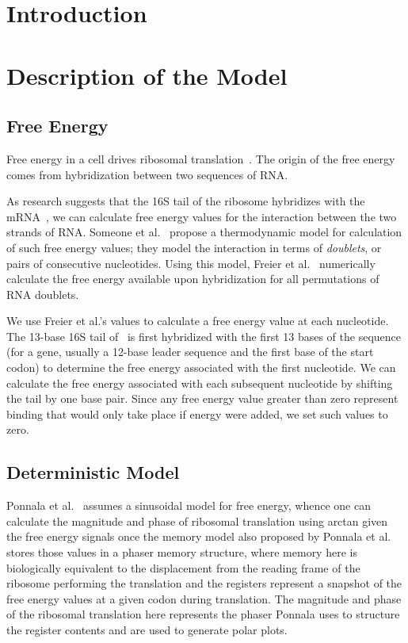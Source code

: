 \documentclass{article}
\begin{document}
\section{Introduction}

\section{Description of the Model}

\subsection{Free Energy}
\label{freeenergy}


Free energy in a cell drives ribosomal translation~\cite{starmer}.
The origin of the free energy comes from hybridization between two sequences of RNA.

As research suggests that the 16S tail of the ribosome hybridizes with the mRNA~\cite{weiss}, 
we can calculate free energy values for the interaction between the two strands of RNA.
Someone et al.~\cite{freier} propose a thermodynamic model for calculation of such free energy values; 
they model the interaction in terms of \emph{doublets}, or pairs of consecutive nucleotides.
Using this model, Freier et al.~\cite{freier} numerically calculate the free energy available upon hybridization for all permutations of RNA doublets.

We use Freier et al.'s values to calculate a free energy value at each nucleotide.  
The 13-base 16S tail of \ecoli\ is first hybridized with the first 13 bases of the sequence 
(for a gene, usually a 12-base leader sequence and the first base of the start codon) to determine
the free energy associated with the first nucleotide.
We can calculate the free energy associated with each subsequent nucleotide by shifting the tail by one base pair.
Since any free energy value greater than zero represent binding that would only take place if energy were added, 
we set such values to zero.

\subsection{Deterministic Model}

Ponnala et al.~\cite{lalit:mechanics} assumes a sinusoidal model for free energy, whence one can calculate
the magnitude and phase of ribosomal translation using arctan given the free energy signals once the memory model
also proposed by Ponnala et al. stores those values in a phaser memory structure,
where memory here is biologically equivalent to the displacement from the reading frame of the ribosome performing the translation
and the registers represent a snapshot of the free energy values at a given codon during translation. The magnitude and phase
of the ribosomal translation here represents the phaser Ponnala uses to structure the register contents and are used to generate
polar plots.
\end{document}
